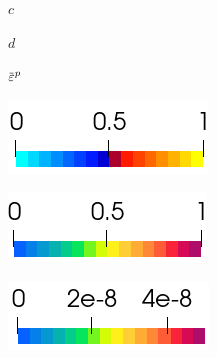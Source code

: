 \begin{figure}[!htbp]
  \centering
  \begin{subfigure}{0.15\textwidth}
    \caption*{}
  \end{subfigure}
  \begin{subfigure}{0.19\textwidth}
    \centering
    \caption*{$c$}
  \end{subfigure}
  \hspace{0.06\textwidth}
  \begin{subfigure}{0.19\textwidth}
    \centering
    \caption*{$d$}
  \end{subfigure}
  \hspace{0.06\textwidth}
  \begin{subfigure}{0.19\textwidth}
    \centering
    \caption*{$\ep$}
  \end{subfigure}
  
  \begin{subfigure}{0.15\textwidth}
    \caption*{}
  \end{subfigure}
  \begin{subfigure}{0.19\textwidth}
    \centering
    \includegraphics[width=\textwidth]{Chapter5/figures/spallation/colorbar_c_rf}
  \end{subfigure}
  \hspace{0.06\textwidth}
  \begin{subfigure}{0.19\textwidth}
    \centering
    \includegraphics[width=\textwidth]{Chapter5/figures/spallation/colorbar_d_rf}
  \end{subfigure}
  \hspace{0.06\textwidth}
  \begin{subfigure}{0.19\textwidth}
    \centering
    \includegraphics[width=\textwidth]{Chapter5/figures/spallation/colorbar_ep_rf}
  \end{subfigure}
  

\end{figure}
